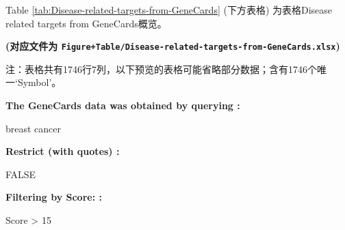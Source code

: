 \documentclass[
]{article}
\begin{document}
\begin{center}\vspace{1.5cm}\end{center}

Table \ref{tab:Disease-related-targets-from-GeneCards} (下方表格) 为表格Disease related targets from GeneCards概览。

\textbf{(对应文件为 \texttt{Figure+Table/Disease-related-targets-from-GeneCards.xlsx})}

\begin{center}\begin{tcolorbox}[colback=gray!10, colframe=gray!50, width=0.9\linewidth, arc=1mm, boxrule=0.5pt]注：表格共有1746行7列，以下预览的表格可能省略部分数据；含有1746个唯一`Symbol'。
\end{tcolorbox}
\end{center}\begin{center}\begin{tcolorbox}[colback=gray!10, colframe=gray!50, width=0.9\linewidth, arc=1mm, boxrule=0.5pt]
\textbf{
The GeneCards data was obtained by querying
:}

\vspace{0.5em}

    breast cancer

\vspace{2em}


\textbf{
Restrict (with quotes)
:}

\vspace{0.5em}

    FALSE

\vspace{2em}


\textbf{
Filtering by Score:
:}

\vspace{0.5em}

    Score > 15

\vspace{2em}
\end{tcolorbox}
\end{center}
\end{document}
